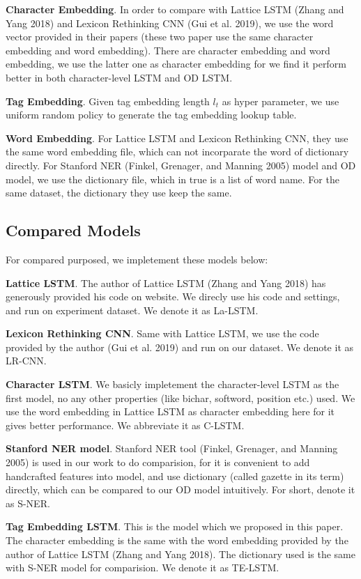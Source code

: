 \documentclass[letterpaper]{article} %
\begin{document}
\textbf{Character Embedding}. In order to compare with Lattice LSTM (Zhang and Yang 2018) and Lexicon Rethinking CNN (Gui et al. 2019), we use the word vector provided in their papers (these two paper use the same character embedding and word embedding). There are character embedding and word embedding, we use the latter one as character embedding for we find it perform better in both character-level LSTM and OD LSTM.

\textbf{Tag Embedding}. Given tag embedding length $l_t$ as hyper parameter, we use uniform random policy to generate the tag embedding lookup table. 

\textbf{Word Embedding}. For Lattice LSTM and Lexicon Rethinking CNN, they use the same word embedding file, which can not incorparate the word of dictionary directly. For Stanford NER (Finkel, Grenager, and Manning 2005) model and OD model, we use the dictionary file, which in true is a list of word name. For the same dataset, the dictionary they use keep the same.

\subsection{Compared Models}

For compared purposed, we impletement these models below:

\textbf{Lattice LSTM}. The author of Lattice LSTM (Zhang and Yang 2018) has generously provided his code on website. We direcly use his code and settings, and run on experiment dataset. We denote it as La-LSTM.

\textbf{Lexicon Rethinking CNN}. Same with Lattice LSTM, we use the code provided by the author (Gui et al. 2019) and run on our dataset. We denote it as LR-CNN.

\textbf{Character LSTM}. We basicly impletement the character-level LSTM as the first model, no any other properties (like bichar, softword, position etc.) used. We use the word embedding in Lattice LSTM as character embedding here for it gives better performance. We abbreviate it as C-LSTM.

\textbf{Stanford NER model}. Stanford NER tool (Finkel, Grenager, and Manning 2005) is used in our work to do comparision, for it is convenient to add handcrafted features into model, and use dictionary (called gazette in its term) directly, which can be compared to our OD model intuitively. For short, denote it as S-NER. 

\textbf{Tag Embedding LSTM}. This is the model which we proposed in this paper. The character embedding is the same with the word embedding provided by the author of Lattice LSTM (Zhang and Yang 2018). The dictionary used is the same with S-NER model for comparision. We denote it as TE-LSTM.
\end{document}
